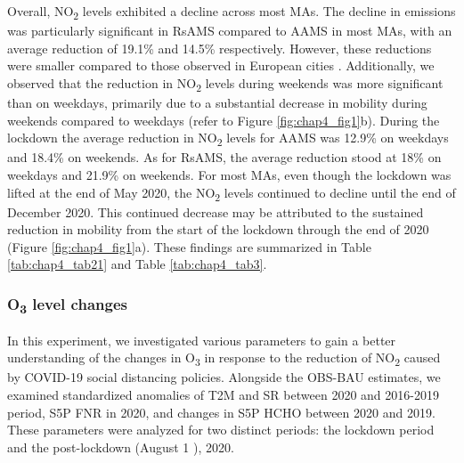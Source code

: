 Overall, NO\textsubscript{2} levels exhibited a decline across most MAs. The decline in emissions was particularly significant in RsAMS compared to AAMS in most MAs, with an average reduction of 19.1\% and 14.5\% respectively. However, these reductions were smaller compared to those observed in European cities \citep{barre2021estimating,grange2021covid}. Additionally, we observed that the reduction in NO\textsubscript{2} levels during weekends was more significant than on weekdays, primarily due to a substantial decrease in mobility during weekends compared to weekdays (refer to Figure \ref{fig:chap4_fig1}b). During the lockdown the average reduction in NO\textsubscript{2} levels for AAMS was 12.9\% on weekdays and 18.4\% on weekends. As for RsAMS, the average reduction stood at 18\% on weekdays and 21.9\% on weekends. For most MAs, even though the lockdown was lifted at the end of May 2020, the NO\textsubscript{2} levels continued to decline until the end of December 2020. This continued decrease may be attributed to the sustained reduction in mobility from the start of the lockdown through the end of 2020 (Figure \ref{fig:chap4_fig1}a). These findings are summarized in Table \ref{tab:chap4_tab21} and Table \ref{tab:chap4_tab3}. \par

\subsubsection{O\textsubscript{3} level changes}
In this experiment, we investigated various parameters to gain a better understanding of the changes in O\textsubscript{3} in response to the reduction of NO\textsubscript{2} caused by COVID-19 social distancing policies. Alongside the OBS-BAU estimates, we examined standardized anomalies of T2M and SR between 2020 and 2016-2019 period, S5P FNR in 2020, and changes in S5P HCHO between 2020 and 2019. These parameters were analyzed for two distinct periods: the lockdown period and the post-lockdown (August 1 ), 2020. \par

